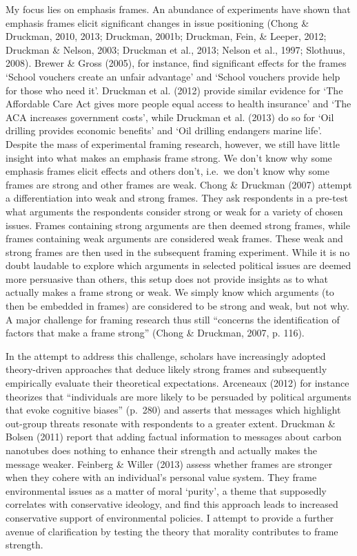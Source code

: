 \documentclass[12pt,econ]{sources/authesis}
\begin{document}
My focus lies on emphasis frames. An abundance of experiments have shown that emphasis frames elicit significant changes in issue positioning (Chong \& Druckman, 2010, 2013; Druckman, 2001b; Druckman, Fein, \& Leeper, 2012; Druckman \& Nelson, 2003; Druckman et al., 2013; Nelson et al., 1997; Slothuus, 2008). Brewer \& Gross (2005), for instance, find significant effects for the frames `School vouchers create an unfair advantage' and `School vouchers provide help for those who need it'. Druckman et al. (2012) provide similar evidence for `The Affordable Care Act gives more people equal access to health insurance' and `The ACA increases government costs', while Druckman et al. (2013) do so for `Oil drilling provides economic benefits' and `Oil drilling endangers marine life'. Despite the mass of experimental framing research, however, we still have little insight into what makes an emphasis frame strong. We don't know why some emphasis frames elicit effects and others don't, i.e.~we don't know why some frames are strong and other frames are weak. Chong \& Druckman (2007) attempt a differentiation into weak and strong frames. They ask respondents in a pre-test what arguments the respondents consider strong or weak for a variety of chosen issues. Frames containing strong arguments are then deemed strong frames, while frames containing weak arguments are considered weak frames. These weak and strong frames are then used in the subsequent framing experiment. While it is no doubt laudable to explore which arguments in selected political issues are deemed more persuasive than others, this setup does not provide insights as to what actually makes a frame strong or weak. We simply know which arguments (to then be embedded in frames) are considered to be strong and weak, but not why. A major challenge for framing research thus still ``concerns the identification of factors that make a frame strong'' (Chong \& Druckman, 2007, p. 116).

In the attempt to address this challenge, scholars have increasingly adopted theory-driven approaches that deduce likely strong frames and subsequently empirically evaluate their theoretical expectations. Arceneaux (2012) for instance theorizes that ``individuals are more likely to be persuaded by political arguments that evoke cognitive biases'' (p.~280) and asserts that messages which highlight out-group threats resonate with respondents to a greater extent. Druckman \& Bolsen (2011) report that adding factual information to messages about carbon nanotubes does nothing to enhance their strength and actually makes the message weaker. Feinberg \& Willer (2013) assess whether frames are stronger when they cohere with an individual's personal value system. They frame environmental issues as a matter of moral `purity', a theme that supposedly correlates with conservative ideology, and find this approach leads to increased conservative support of environmental policies. I attempt to provide a further avenue of clarification by testing the theory that morality contributes to frame strength.
\end{document}
